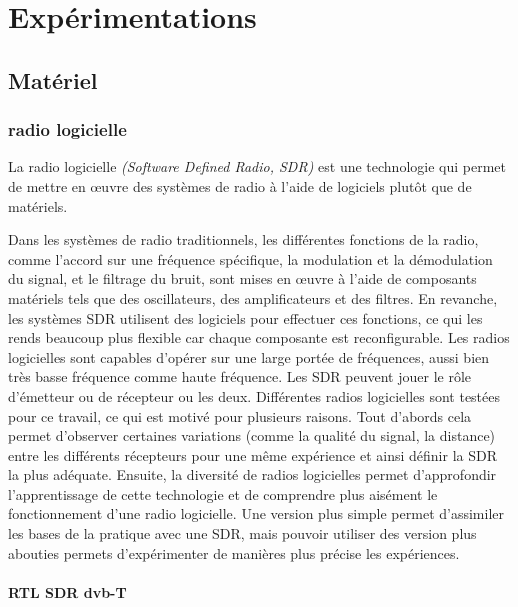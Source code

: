\chapter{Expérimentations}


\renewcommand{\leftmark}{EXPERIMENTATIONS}

\section{Matériel}

\subsection{radio logicielle}

La radio logicielle \textit{(Software Defined Radio, SDR)} est une technologie qui permet de mettre en œuvre des systèmes de radio à l'aide de logiciels plutôt que de matériels. 

\vspace{0.1cm}

Dans les systèmes de radio traditionnels, les différentes fonctions de la radio, comme l'accord sur une fréquence spécifique, la modulation et la démodulation du signal, et le filtrage du bruit, sont mises en œuvre à l'aide de composants matériels tels que des oscillateurs, des amplificateurs et des filtres. En revanche, les systèmes SDR utilisent des logiciels pour effectuer ces fonctions, ce qui les rends beaucoup plus flexible car chaque composante est reconfigurable. Les radios logicielles sont capables d'opérer sur une large portée de fréquences, aussi bien très basse fréquence comme haute fréquence.
Les SDR peuvent jouer le rôle d'émetteur ou de récepteur ou les deux. Différentes radios logicielles sont testées pour ce travail, ce qui est motivé pour plusieurs raisons. Tout d'abords cela permet d'observer certaines variations (comme la qualité du signal, la distance) entre les différents récepteurs pour une même expérience et ainsi définir la SDR la plus adéquate. Ensuite, la diversité de radios logicielles permet d'approfondir l'apprentissage de cette technologie et de comprendre plus aisément le fonctionnement d'une radio logicielle. Une version plus simple permet d'assimiler les bases de la pratique avec une SDR, mais pouvoir utiliser des version plus abouties permets d'expérimenter de manières plus précise les expériences.

\newpage

\subsubsection{RTL SDR dvb-T}\label{dvbt}

